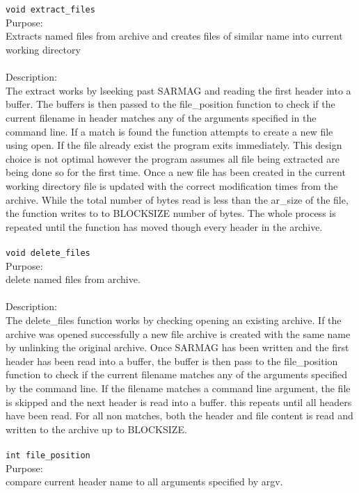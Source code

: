 \documentclass[12pt,letterpaper]{article}
\begin{document}
\\\\
\texttt{void extract\_files}
\\
Purpose:
\\
Extracts named files from archive and creates files of similar name into current working directory
\\\\
Description:
\\
The extract works by lseeking past SARMAG and reading the first header into a buffer. The buffers is then passed to the file\_position function to check if the current filename in header matches any of the arguments specified in the command line. If a match is found the function attempts to create a new file using open. If the file already exist the program exits immediately. This design choice is not optimal however the program assumes all file being extracted are being done so for the first time. Once a new file has been created in the current working directory file is updated with the correct modification times from the archive. While the total number of bytes read is less than the ar\_size of the file, the function writes to to BLOCKSIZE number of bytes. The whole process is repeated until the function has moved though every header in the archive.
\\\\
\texttt{void delete\_files}
\\
Purpose:
\\
delete named files from archive.
\\\\
Description:
\\
The delete\_files function works by checking opening an existing archive. If the archive was opened successfully a new file archive is created with the same name by unlinking the original archive. Once SARMAG has been written and the first header has been read into a buffer, the buffer is then pass to the file\_position function to check if the current filename matches any of the arguments specified by the command line. If the filename matches a command line argument, the file is skipped and the next header is read into a buffer. this repeats until all headers have been read. For all non matches, both the header and file content is read and written to the archive up to BLOCKSIZE.
\\\\
\texttt{int file\_position}
\\
Purpose:
\\
compare current header name to all arguments specified by argv.
\end{document}
